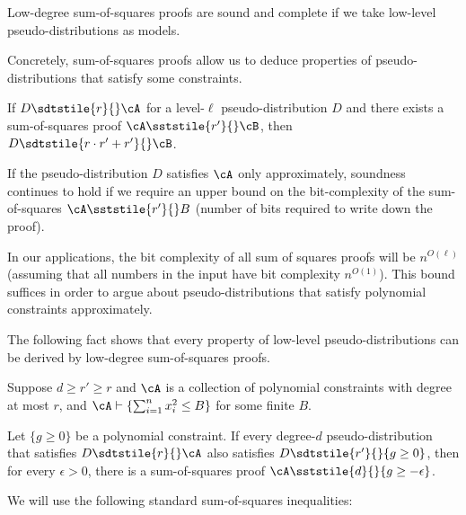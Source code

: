 Low-degree sum-of-squares proofs are sound and complete if we take low-level pseudo-distributions as models.

Concretely, sum-of-squares proofs allow us to deduce properties of pseudo-distributions that satisfy some constraints.

\begin{fact}[Soundness]
  \label{fact:sos-soundness}
  If $D \sdtstile{r}{} \cA$ for a level-$\ell$ pseudo-distribution $D$ and there exists a sum-of-squares proof $\cA \sststile{r'}{} \cB$, then $D \sdtstile{r\cdot r'+r'}{} \cB$.
\end{fact}

If the pseudo-distribution $D$ satisfies $\cA$ only approximately, soundness continues to hold if we require an upper bound on the bit-complexity of the sum-of-squares $\cA \sststile{r'}{} B$  (number of bits required to write down the proof).

In our applications, the bit complexity of all sum of squares proofs will be $n^{O(\ell)}$ (assuming that all numbers in the input have bit complexity $n^{O(1)}$).
This bound suffices in order to argue about pseudo-distributions that satisfy polynomial constraints approximately.

The following fact shows that every property of low-level pseudo-distributions can be derived by low-degree sum-of-squares proofs.

\begin{fact}[Completeness]
  \label{fact:sos-completeness}
  Suppose $d \geq r' \geq r$ and $\cA$ is a collection of polynomial constraints with degree at most $r$, and $\cA \vdash \{ \sum_{i = 1}^n x_i^2 \leq B\}$ for some finite $B$.

  Let $\{g \geq 0 \}$ be a polynomial constraint.
  If every degree-$d$ pseudo-distribution that satisfies $D \sdtstile{r}{} \cA$ also satisfies $D \sdtstile{r'}{} \{g \geq 0 \}$, then for every $\epsilon > 0$, there is a sum-of-squares proof $\cA \sststile{d}{} \{g \geq - \epsilon \}$.
\end{fact}

We will use the following standard sum-of-squares inequalities:

